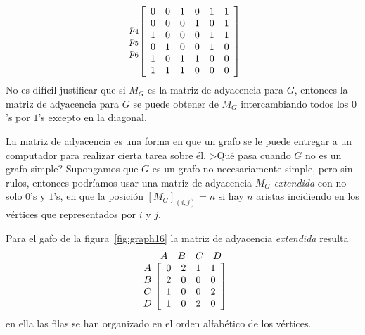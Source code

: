 \begin{ejemplo}
\[\begin{array}{cc}
\begin{array}{c}
p_4\\
p_5\\
p_6
\end{array}
& \hspace*{-1.5em}
\left[
\begin{array}{ccccccccc}
0&0&1&0&1&1 \\
0&0&0&1&0&1 \\
1&0&0&0&1&1 \\
0&1&0&0&1&0 \\
1&0&1&1&0&0 \\
1&1&1&0&0&0 \\
\end{array}
\right]
\end{array}
\]
No es difícil justificar que si $M_G$ es la matriz de adyacencia para $G$, entonces la matriz de adyacencia para $\overline G$ se puede obtener de $M_G$ intercambiando todos los $0$'s por $1$'s excepto en la diagonal.
\end{ejemplo}

La matriz de adyacencia es una forma en que un grafo se le puede entregar a un computador para realizar cierta tarea sobre él.
>Qué pasa cuando $G$ no es un grafo simple?
Supongamos que $G$ es un grafo no necesariamente simple, pero sin rulos, entonces podríamos usar una matriz de adyacencia $M_G$ \emph{extendida} con no solo $0$'s y $1$'s, en que la posición $[M_G]_{(i,j)}=n$ si hay $n$ aristas incidiendo en los vértices que representados por $i$ y $j$.

\begin{ejemplo}
Para el gafo de la figura~\ref{fig:graph16} la matriz de adyacencia \emph{extendida} resulta
\[
\begin{array}{cc}
& \hspace*{-1.2em}
\begin{array}{ccccc}
A&B&C&D\\
\end{array}\\
\begin{array}{c}
A\\
B\\
C\\
D
\end{array}
& \hspace*{-1.2em}
\left[
\begin{array}{ccccc}
0&2&1&1\\
2&0&0&0\\
1&0&0&2\\
1&0&2&0
\end{array}
\right]
\end{array}
\]
en ella las filas se han organizado en el orden alfabético de los vértices.
\end{ejemplo}

